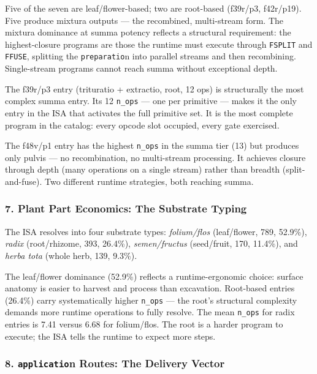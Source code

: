 \documentclass[12pt,a4paper]{article}
\begin{document}
Five of the seven are leaf/flower-based; two are root-based (f39r/p3,
f42r/p19). Five produce mixtura outputs --- the recombined, multi-stream
form. The mixtura dominance at summa potency reflects a structural
requirement: the highest-closure programs are those the runtime must
execute through \texttt{FSPLIT} and \texttt{FFUSE}, splitting the
\texttt{preparatio}n into parallel streams and then recombining.
Single-stream programs cannot reach summa without exceptional depth.

The f39r/p3 entry (trituratio + extractio, root, 12 ops) is structurally
the most complex summa entry. Its 12 \texttt{n\_ops} --- one per
primitive --- makes it the only entry in the ISA that activates the full
primitive set. It is the most complete program in the catalog: every
opcode slot occupied, every gate exercised.

The f48v/p1 entry has the highest \texttt{n\_ops} in the summa tier (13)
but produces only pulvis --- no recombination, no multi-stream
processing. It achieves closure through depth (many operations on a
single stream) rather than breadth (split-and-fuse). Two different
runtime strategies, both reaching summa.

\hypertarget{plant-part-economics-the-substrate-typing}{%
\subsubsection{7. Plant Part Economics: The Substrate
Typing}\label{plant-part-economics-the-substrate-typing}}

The ISA resolves into four substrate types: \emph{folium/flos}
(leaf/flower, 789, 52.9\%), \emph{radix} (root/rhizome, 393, 26.4\%),
\emph{semen/fructus} (seed/fruit, 170, 11.4\%), and \emph{herba tota}
(whole herb, 139, 9.3\%).

The leaf/flower dominance (52.9\%) reflects a runtime-ergonomic choice:
surface anatomy is easier to harvest and process than excavation.
Root-based entries (26.4\%) carry systematically higher \texttt{n\_ops}
--- the root's structural complexity demands more runtime operations to
fully resolve. The mean \texttt{n\_ops} for radix entries is 7.41 versus
6.68 for folium/flos. The root is a harder program to execute; the ISA
tells the runtime to expect more steps.

\hypertarget{application-routes-the-delivery-vector}{%
\subsubsection{\texorpdfstring{8. \texttt{applicatio}n Routes: The
Delivery
Vector}{8. application Routes: The Delivery Vector}}\label{application-routes-the-delivery-vector}}
\end{document}
